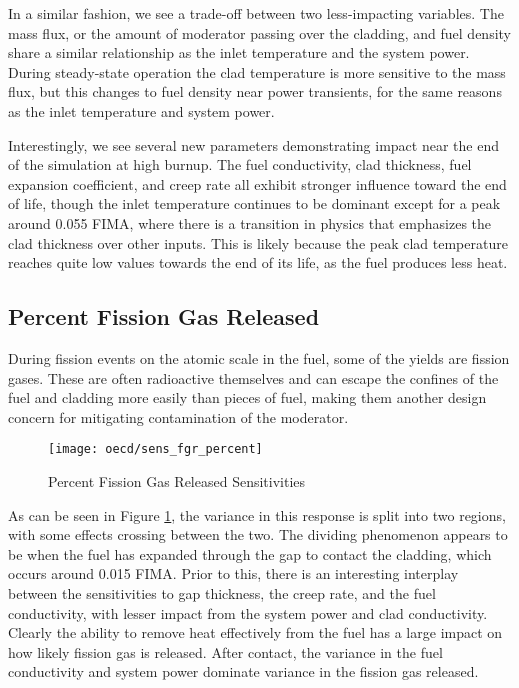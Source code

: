 In a similar fashion, we see a trade-off between two less-impacting variables.  The mass flux, or the amount
of moderator passing over the cladding, and fuel density share a similar relationship as the inlet temperature
and the system power. During
steady-state operation the clad temperature is more sensitive to the mass flux, but this changes to fuel
density near power transients, for the same reasons as the inlet temperature and system power.

Interestingly, we see several new parameters demonstrating impact near the end of the simulation at high
burnup.  The fuel conductivity, clad thickness, fuel expansion coefficient, and creep rate all exhibit
stronger influence toward the end of life, though the inlet temperature continues to be dominant except for a
peak around 0.055 FIMA, where there is a transition in physics that emphasizes the clad thickness over other
inputs. This is likely because the peak clad temperature reaches quite low values towards the end of its life,
as the fuel produces less heat.

\subsection{Percent Fission Gas Released}
During fission events on the atomic scale in the fuel, some of the yields are fission gases.  These are
often radioactive themselves and can escape the confines of the fuel and cladding more easily than pieces of
fuel, making them another design concern for mitigating contamination of the moderator.
\begin{figure}[H]
  \centering
  \texttt{[image: oecd/sens\_fgr\_percent]}
  \caption{Percent Fission Gas Released Sensitivities}
  \label{fig:oecd fgr}
\end{figure}
As can be seen in Figure \ref{fig:oecd fgr}, the variance in this response is split into two regions,
with some effects crossing between the two.  The dividing phenomenon appears to be when the fuel has expanded
through the gap to contact the cladding, which occurs around 0.015 FIMA.  Prior to this, there is an
interesting interplay between the sensitivities to gap thickness, the creep rate, and the fuel conductivity, 
with lesser impact
from the system power and clad conductivity.  Clearly the ability to remove heat effectively from the fuel has
a large impact on how likely fission gas is released.  After contact, the variance in the fuel conductivity
and system power dominate variance in the fission gas released.


